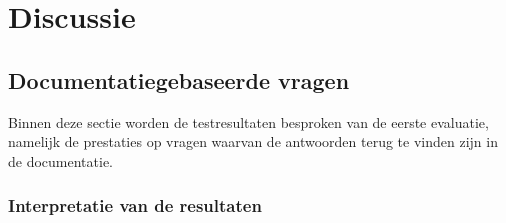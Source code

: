 
\chapter{Discussie}
\label{ch:discussie}






\section{Documentatiegebaseerde vragen}

Binnen deze sectie worden de testresultaten besproken van de eerste evaluatie, namelijk de prestaties op vragen waarvan de antwoorden terug te vinden zijn in de documentatie.

\subsection{Interpretatie van de resultaten}


